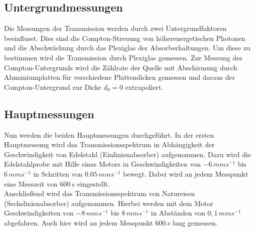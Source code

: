 	
	
	\clearpage
	\subsection{Untergrundmessungen}
	
	Die Messungen der Transmission werden durch zwei Untergrundfaktoren beeinflusst. Dies sind die Compton-Streuung von höherenergetischen Photonen und die Abschwächung durch das Plexiglas der Absorberhaltungen. Um diese zu bestimmen wird die Transmission durch Plexiglas gemessen. Zur Messung des Compton-Untergrunds wird die Zählrate der Quelle mit Abschirmung durch Aluminiumplatten für verschiedene Plattendicken gemessen und daraus der Compton-Untergrund zur Dicke $d_0=0$ extrapoliert.
	
	\subsection{Hauptmessungen}
	
	Nun werden die beiden Hauptmessungen durchgeführt. In der ersten Hauptmessung wird das Transmissionsspektrum in Abhängigkeit der Geschwindigkeit von Edelstahl (Einlinienabsorber) aufgenommen. Dazu wird die Edelstahlprobe mit Hilfe eines Motors in Geschwindigkeiten von $-6\,\si{mms^{-1}}$ bis $6\,\si{mms^{-1}}$ in Schritten von $0.05\,\si{mms^{-1}}$ bewegt. Dabei wird an jedem Messpunkt eine Messzeit von $600\,\si{s}$ eingestellt.\\
	
	Anschließend wird das Transmissionsspektrum von Natureisen (Sechslinienabsorber) aufgenommen. Hierbei werden mit dem Motor Geschwindigkeiten von $-8\,\si{mms^{-1}}$ bis $8\,\si{mms^{-1}}$ in Abständen von $0,1\,\si{mms^{-1}}$ abgefahren. Auch hier wird an jedem Messpunkt $600\,\si{s}$ lang gemessen.
	
